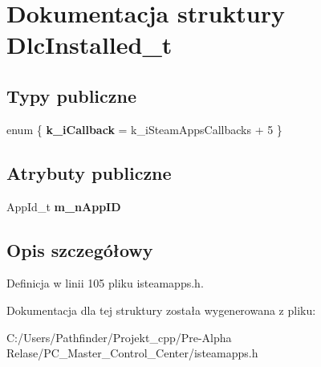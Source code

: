 \hypertarget{struct_dlc_installed__t}{}\section{Dokumentacja struktury Dlc\+Installed\+\_\+t}
\label{struct_dlc_installed__t}
\subsection*{Typy publiczne}
\begin{DoxyCompactItemize}
\item 
\mbox{\label{struct_dlc_installed__t_a68a77d9009f92294475806adade1db56}} 
enum \{ {\bfseries k\+\_\+i\+Callback} = k\+\_\+i\+Steam\+Apps\+Callbacks + 5
 \}
\end{DoxyCompactItemize}
\subsection*{Atrybuty publiczne}
\begin{DoxyCompactItemize}
\item 
\mbox{\label{struct_dlc_installed__t_aebd2a32fcef8ea6578467987ec323d72}} 
App\+Id\+\_\+t {\bfseries m\+\_\+n\+App\+ID}
\end{DoxyCompactItemize}


\subsection{Opis szczegółowy}


Definicja w linii 105 pliku isteamapps.\+h.



Dokumentacja dla tej struktury została wygenerowana z pliku\+:\begin{DoxyCompactItemize}
\item 
C\+:/\+Users/\+Pathfinder/\+Projekt\+\_\+cpp/\+Pre-\/\+Alpha Relase/\+P\+C\+\_\+\+Master\+\_\+\+Control\+\_\+\+Center/isteamapps.\+h\end{DoxyCompactItemize}
